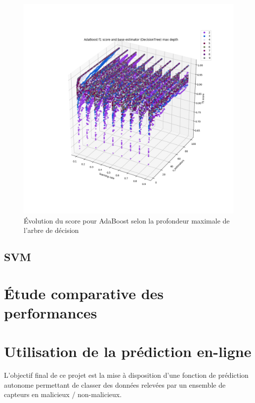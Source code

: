 \documentclass[a4paper]{report}
\begin{document}
\begin{figure}
\centering
\includegraphics[width=\textwidth]{img/adaboost_depth.png}
\caption{Évolution du score pour AdaBoost selon la profondeur maximale de l'arbre de décision\label{adaboost_depth}}
\end{figure}

\subsection{SVM}

\section{Étude comparative des performances}

\section{Utilisation de la prédiction en-ligne}

L'objectif final de ce projet est la mise à disposition d'une fonction de prédiction autonome permettant de classer des données relevées par un ensemble de capteurs en malicieux / non-malicieux.
\end{document}
